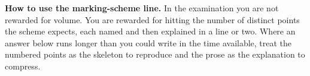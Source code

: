 \documentclass[11pt,a4paper,oneside]{book}
\begin{document}
\begin{tcolorbox}[colback=tint,colframe=ocre,boxrule=0.8pt,sharp corners,
  fontupper=\small, breakable]
\textbf{\sffamily How to use the marking-scheme line.} In the examination you
are not rewarded for volume. You are rewarded for hitting the number of
distinct points the scheme expects, each named and then explained in a line or
two. Where an answer below runs longer than you could write in the time
available, treat the numbered points as the skeleton to reproduce and the prose
as the explanation to compress.
\end{tcolorbox}

\clearpage
\tableofcontents

\mainmatter
\pagestyle{fancy}







\appendix

\end{document}
